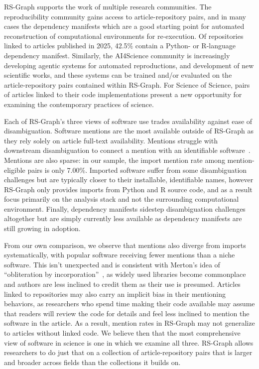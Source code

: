\documentclass[pdflatex,sn-nature]{sn-jnl}%
\begin{document}
RS-Graph supports the work of multiple research communities. The reproducibility community gains access to article-repository pairs, and in many cases the dependency manifests which are a good starting point for automated reconstruction of computational environments for re-execution. Of repositories linked to articles published in 2025, 42.5\% contain a Python- or R-language dependency manifest. Similarly, the AI4Science community is increasingly developing agentic systems for automated reproductions, and development of new scientific works, and these systems can be trained and/or evaluated on the article-repository pairs contained within RS-Graph. For Science of Science, pairs of articles linked to their code implementations present a new opportunity for examining the contemporary practices of science.

Each of RS-Graph's three views of software use trades availability against ease of disambiguation. Software mentions are the most available outside of RS-Graph as they rely solely on article full-text availability. Mentions struggle with downstream disambiguation to connect a mention with an identifiable software~\cite{druskat2024dontmention,brown2026biomedical}. Mentions are also sparse: in our sample, the import mention rate among mention-eligible pairs is only 7.00\%. Imported software suffer from some disambiguation challenges but are typically closer to their installable, identifiable names, however RS-Graph only provides imports from Python and R source code, and as a result focus primarily on the analysis stack and not the surrounding computational environment. Finally, dependency manifests sidestep disambiguation challenges altogether but are simply currently less available as dependency manifests are still growing in adoption.

From our own comparison, we observe that mentions also diverge from imports systematically, with popular software receiving fewer mentions than a niche software. This isn't unexpected and is consistent with Merton's idea of ``obliteration by incorporation''~\cite{merton1968social}, as widely used libraries become commonplace and authors are less inclined to credit them as their use is presumed. Articles linked to repositories may also carry an implicit bias in their mentioning behaviors, as researchers who spend time making their code available may assume that readers will review the code for details and feel less inclined to mention the software in the article. As a result, mention rates in RS-Graph may not generalize to articles without linked code. We believe then that the most comprehensive view of software in science is one in which we examine all three. RS-Graph allows researchers to do just that on a collection of article-repository pairs that is larger and broader across fields than the collections it builds on.
\end{document}
